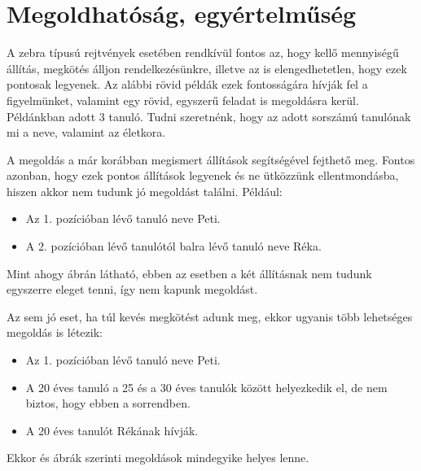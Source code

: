 \documentclass[12ppt,a4paper,oneside]{report}
\begin{document}

    \section{Megoldhatóság, egyértelműség} %

A zebra típusú rejtvények esetében rendkívül fontos az, hogy kellő mennyiségű állítás, megkötés álljon rendelkezésünkre, illetve az is elengedhetetlen, hogy ezek pontosak legyenek. Az alábbi rövid példák ezek fontosságára hívják fel a figyelmünket, valamint egy rövid, egyszerű feladat is megoldásra kerül.
Példánkban adott 3 tanuló. Tudni szeretnénk, hogy az adott sorszámú tanulónak mi a neve, valamint az életkora.

A megoldás a már korábban megismert állítások segítségével fejthető meg. Fontos azonban, hogy ezek pontos állítások legyenek és ne ütközzünk ellentmondásba, hiszen akkor nem tudunk jó megoldást találni. Például:
\begin{itemize}
\item Az 1. pozícióban lévő tanuló neve Peti.
\item A 2. pozícióban lévő tanulótól balra lévő tanuló neve Réka.
\end{itemize}

Mint ahogy  ábrán látható, ebben az esetben a két állításnak nem tudunk egyszerre eleget tenni, így nem kapunk megoldást.


Az sem jó eset, ha túl kevés megkötést adunk meg, ekkor ugyanis több lehetséges megoldás is létezik:
\begin{itemize}
\item Az 1. pozícióban lévő tanuló neve Peti.
\item A 20 éves tanuló a 25 és a 30 éves tanulók között helyezkedik el, de nem biztos, hogy ebben a sorrendben.
\item A 20 éves tanulót Rékának hívják.
\end{itemize}

Ekkor   és  ábrák szerinti megoldások mindegyike helyes lenne.

\end{document}
